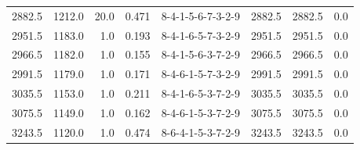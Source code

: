 \begin{tabular}{rrrrlrrr}
 2882.5 &  1212.0 &           20.0 &              0.471 &  8-4-1-5-6-7-3-2-9 &        2882.5 &          2882.5 &       0.0 \\
 2951.5 &  1183.0 &            1.0 &              0.193 &  8-4-1-6-5-7-3-2-9 &        2951.5 &          2951.5 &       0.0 \\
 2966.5 &  1182.0 &            1.0 &              0.155 &  8-4-1-5-6-3-7-2-9 &        2966.5 &          2966.5 &       0.0 \\
 2991.5 &  1179.0 &            1.0 &              0.171 &  8-4-6-1-5-7-3-2-9 &        2991.5 &          2991.5 &       0.0 \\
 3035.5 &  1153.0 &            1.0 &              0.211 &  8-4-1-6-5-3-7-2-9 &        3035.5 &          3035.5 &       0.0 \\
 3075.5 &  1149.0 &            1.0 &              0.162 &  8-4-6-1-5-3-7-2-9 &        3075.5 &          3075.5 &       0.0 \\
 3243.5 &  1120.0 &            1.0 &              0.474 &  8-6-4-1-5-3-7-2-9 &        3243.5 &          3243.5 &       0.0 \\
\bottomrule
\end{tabular}
